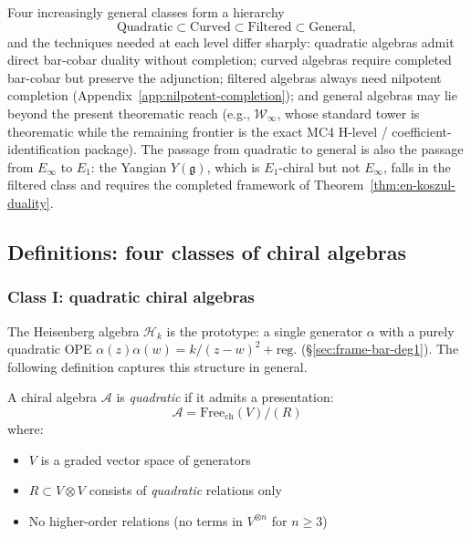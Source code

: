 \iffalse
Four increasingly general classes form a hierarchy
\begin{equation}
\text{Quadratic} \subset \text{Curved} \subset \text{Filtered} \subset \text{General},
\end{equation}
and the techniques needed at each level differ sharply: quadratic
algebras admit direct bar-cobar duality without completion; curved
algebras require completed bar-cobar but preserve the adjunction;
filtered algebras always need nilpotent completion
(Appendix~\ref{app:nilpotent-completion}); and general algebras may
lie beyond the present theorematic reach (e.g., $\mathcal{W}_\infty$,
whose standard tower is theorematic while the remaining frontier is the
exact MC4 H-level / coefficient-identification package).
The passage from quadratic to general is also the passage from $E_\infty$
to $E_1$: the Yangian $Y(\mathfrak{g})$, which is $E_1$-chiral but
not $E_\infty$, falls in the filtered class and requires the
completed framework of Theorem~\ref{thm:en-koszul-duality}.

\subsection{Definitions: four classes of chiral algebras}

\subsubsection{Class I: quadratic chiral algebras}

\begin{definition}\label{def:quadratic-chiral}
The Heisenberg algebra $\mathcal{H}_k$ is the prototype: a single generator $\alpha$ with a purely quadratic OPE $\alpha(z)\alpha(w) = k/(z-w)^2 + \mathrm{reg.}$ (\S\ref{sec:frame-bar-deg1}).  The following definition captures this structure in general.

A chiral algebra $\mathcal{A}$ is \emph{quadratic} if it admits a presentation:
\begin{equation}
\mathcal{A} = \text{Free}_{\text{ch}}(V) / (R)
\end{equation}
where:
\begin{itemize}
\item $V$ is a graded vector space of generators
\item $R \subset V \otimes V$ consists of \emph{quadratic} relations only
\item No higher-order relations (no terms in $V^{\otimes n}$ for $n \geq 3$)
\end{itemize}
\end{definition}

